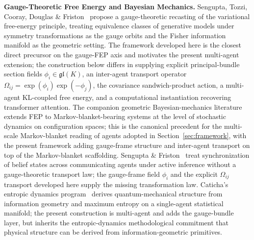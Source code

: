 \documentclass[11pt]{article}
\begin{document}
\textbf{Gauge-Theoretic Free Energy and Bayesian Mechanics.} Sengupta, Tozzi, Cooray, Douglas \& Friston~\cite{Sengupta2016NeuronalGauge} propose a gauge-theoretic recasting of the variational free-energy principle, treating equivalence classes of generative models under symmetry transformations as the gauge orbits and the Fisher information manifold as the geometric setting. The framework developed here is the closest direct precursor on the gauge-FEP axis and motivates the present multi-agent extension; the construction below differs in supplying explicit principal-bundle section fields $\phi_i \in \mathfrak{gl}(K)$, an inter-agent transport operator $\Omega_{ij} = \exp(\phi_i)\exp(-\phi_j)$, the covariance sandwich-product action, a multi-agent KL-coupled free energy, and a computational instantiation recovering transformer attention. The companion geometric Bayesian-mechanics literature~\cite{Sakthivadivel2022, KirchhoffParrPalaciosFristonKiverstein2018} extends FEP to Markov-blanket-bearing systems at the level of stochastic dynamics on configuration spaces; this is the canonical precedent for the multi-scale Markov-blanket reading of agents adopted in Section~\ref{sec:framework}, with the present framework adding gauge-frame structure and inter-agent transport on top of the Markov-blanket scaffolding. Sengupta \& Friston~\cite{SenguptaFriston2018} treat synchronization of belief states across communicating agents under active inference without a gauge-theoretic transport law; the gauge-frame field $\phi_i$ and the explicit $\Omega_{ij}$ transport developed here supply the missing transformation law. Caticha's entropic dynamics program~\cite{Caticha2019} derives quantum-mechanical structure from information geometry and maximum entropy on a single-agent statistical manifold; the present construction is multi-agent and adds the gauge-bundle layer, but inherits the entropic-dynamics methodological commitment that physical structure can be derived from information-geometric primitives.
\end{document}
